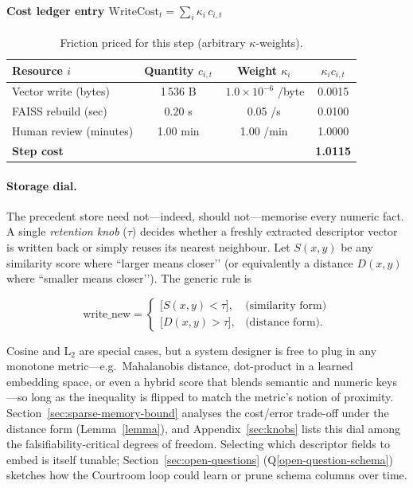 \documentclass[11pt]{article}
\begin{document}
\paragraph{Cost ledger entry $\displaystyle\text{WriteCost}_t=\sum_i\kappa_i\,c_{i,t}$}

\begin{table}[h]
\centering\footnotesize
\begin{tabular}{@{}lccc@{}}
\toprule
Resource $i$ & Quantity $c_{i,t}$ & Weight $\kappa_i$ & $\kappa_i c_{i,t}$ \\ \midrule
Vector write (bytes)      & 1\,536 B & \,$1.0\times10^{-6}$ /byte & 0.0015 \\
FAISS rebuild (sec)       & 0.20 s   & 0.05 /s                 & 0.0100 \\
Human review (minutes)    & 1.00 min & 1.00 /min               & 1.0000 \\ \midrule
\textbf{Step cost}  & & &  \textbf{1.0115} \\ \bottomrule
\end{tabular}
\caption{Friction priced for this step (arbitrary $\kappa$-weights).}
\end{table}

\paragraph{Storage dial.}
The precedent store need not—indeed, should not—memorise every numeric
fact. A single \emph{retention knob} (\(\tau\)) decides whether a freshly
extracted descriptor vector is written back or simply reuses its nearest
neighbour. Let \(S(x,y)\) be any similarity score where “larger means
closer’’ (or equivalently a distance \(D(x,y)\) where “smaller means
closer’’). The generic rule is

\[
\text{write\_new} =
\begin{cases}
\bigl[S(x,y) < \tau\bigr], & \text{(similarity form)}\\[4pt]
\bigl[D(x,y) > \tau\bigr], & \text{(distance form)}.
\end{cases}
\]

Cosine and L$_2$ are special cases, but a system designer is free to
plug in any monotone metric—e.g.\ Mahalanobis distance, dot-product in a
learned embedding space, or even a hybrid score that blends semantic and
numeric keys—so long as the inequality is flipped to match the
metric's notion of proximity. Section~\ref{sec:sparse-memory-bound} analyses the cost/error trade-off
under the distance form (Lemma~\ref{lemma}), and Appendix~\ref{sec:knobs} lists this dial
among the falsifiability-critical degrees of freedom. Selecting which descriptor 
fields to embed is itself tunable; Section~\ref{sec:open-questions} (Q\ref{open-question-schema}) sketches how the Courtroom loop 
could learn or prune schema columns over time.
\end{document}
